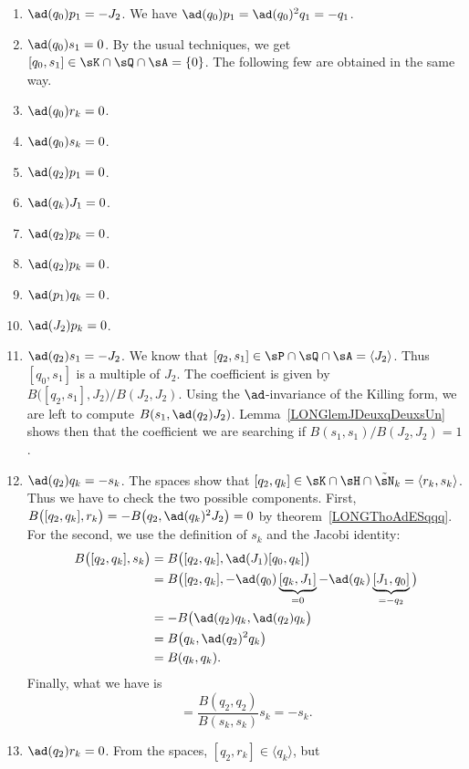 \begin{enumerate}
	\item$\ad(q_0)p_1=-J_2$\label{LONGItemComqzpun}. We have $\ad(q_0)p_1=\ad(q_0)^2q_1=-q_1$.
	\item$\ad(q_0)s_1=0$. By the usual techniques, we get $[q_0,s_1]\in\sK\cap\sQ\cap\sA=\{ 0 \}$. The following few are obtained in the same way.
	\item$\ad(q_0)r_k=0$\label{LONGItemComqzrk}.
	\item$\ad(q_0)s_k=0$.
	\item$\ad(q_2)p_1=0$.
	\item$\ad(q_k)J_1=0$.
	\item$\ad(q_2)p_k=0$.
	\item$\ad(q_2)p_k=0$.
	\item$\ad(p_1)q_k=0$\label{LONGItemCompunqk}.
	\item$\ad(J_2)p_k=0$.
	\item$\ad(q_2)s_1=-J_2$. We know that $[q_2,s_1]\in\sP\cap\sQ\cap\sA=\langle J_2\rangle$. Thus $[q_0,s_1]$ is a multiple of $J_2$. The coefficient is given by$B\big( [q_2,s_1],J_2 \big)/B(J_2,J_2)$. Using the $\ad$-invariance of the Killing form, we are left to compute $B(s_1,\ad(q_2)J_2)$. Lemma~\ref{LONGlemJDeuxqDeuxsUn} shows then that the coefficient we are searching if $B(s_1,s_1)/B(J_2,J_2)=1$.
	\item\label{LONGItemComqdeuxqk}$\ad(q_2)q_k=-s_k$. The spaces show that $[q_2,q_k]\in\sK\cap\sH\cap\tilde\sN_k=\langle r_k,s_k\rangle$. Thus we have to check the two possible components. First, $B\big( [q_2,q_k],r_k \big)=-B\big( q_2,\ad(q_k)^2J_2 \big)=0$ by theorem~\ref{LONGThoAdESqqq}. For the second, we use the definition of $s_k$ and the Jacobi identity:
		\begin{equation}
			\begin{aligned}[]
				B\big( [q_2,q_k],s_k \big)&=B\big( [q_2,q_k],\ad(J_1)[q_0,q_k] \big)\\
				&=B\big( [q_2,q_k],-\ad(q_0)\underbrace{[q_k,J_1]}_{=0}-\ad(q_k)\underbrace{[J_1,q_0]}_{=-q_2} \big)\\
				&=-B\big( \ad(q_2)q_k,\ad(q_2)q_k \big)\\
				&=B\big( q_k,\ad(q_2)^2q_k \big)\\
				&=B(q_k,q_k).
			\end{aligned}
		\end{equation}
		Finally, what we have is
		\begin{equation}
			[q_2,q_k]=\frac{ B(q_2,q_2) }{ B(s_k,s_k) }s_k=-s_k.
		\end{equation}
	\item$\ad(q_2)r_k=0$. From the spaces, $[q_2,r_k]\in\langle q_k\rangle$, but

\end{enumerate}
